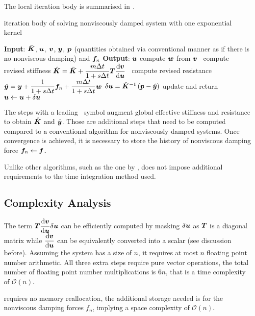 The local iteration body is summarised in .
\begin{breakablealgorithm}
\caption{iteration body of solving nonviscously damped system with one exponential kernel}\label{algo:single_model}
\begin{algorithmic}
\State \textbf{Input}: $\bar{\bm{K}}$, $\bm{u}$, $\bm{v}$, $\bm{y}$, $\bm{p}$ (quantities obtained via conventional manner as if there is no nonviscous damping) and $\bm{f}_n$
\State \textbf{Output}: $\bm{u}$
\State compute $\bm{w}$ from $\bm{v}$
\State \faMicrochip~compute revised stiffness $\hat{\bm{K}}=\bar{\bm{K}}+\dfrac{m\Delta{}t}{1+s\Delta{}t}\bm{T}\dfrac{\mathrm{d}\bm{v}}{\mathrm{d}\bm{u}}$
\State \faMicrochip~compute revised resistance $\hat{\bm{y}}=\bm{y}+\dfrac{1}{1+s\Delta{}t}\bm{f}_n+\dfrac{m\Delta{}t}{1+s\Delta{}t}\bm{w}$
\State $\delta\bm{u}=\hat{\bm{K}}^{-1}\left(\bm{p}-\hat{\bm{y}}\right)$
\State update and return $\bm{u}\leftarrow\bm{u}+\delta\bm{u}$
\end{algorithmic}
\end{breakablealgorithm}
The steps with a leading \faMicrochip~symbol augment global effective stiffness and resistance to obtain $\hat{\bm{K}}$ and $\hat{\bm{y}}$. Those are additional steps that need to be computed compared to a conventional algorithm for nonviscously damped systems. Once convergence is achieved, it is necessary to store the history of nonviscous damping force $\bm{f}_n\leftarrow\bm{f}$.

Unlike other algorithms, such as the one by \citet{Cortes2009},  does not impose additional requirements to the time integration method used.
\subsection{Complexity Analysis}
The term $\bm{T}\dfrac{\mathrm{d}\bm{v}}{\mathrm{d}\bm{u}}\delta\bm{u}$ can be efficiently computed by masking $\delta\bm{u}$ as $\bm{T}$ is a diagonal matrix while $\dfrac{\mathrm{d}\bm{v}}{\mathrm{d}\bm{u}}$ can be equivalently converted into a scalar (see discussion before). Assuming the system has a size of $n$, it requires at most $n$ floating point number arithmetic. All three extra steps require pure vector operations, the total number of floating point number multiplications is $6n$, that is a time complexity of $\mathcal{O}\left(n\right)$.

 requires no memory reallocation, the additional storage needed is for the nonviscous damping forces $f_n$, implying a space complexity of $\mathcal{O}\left(n\right)$.
